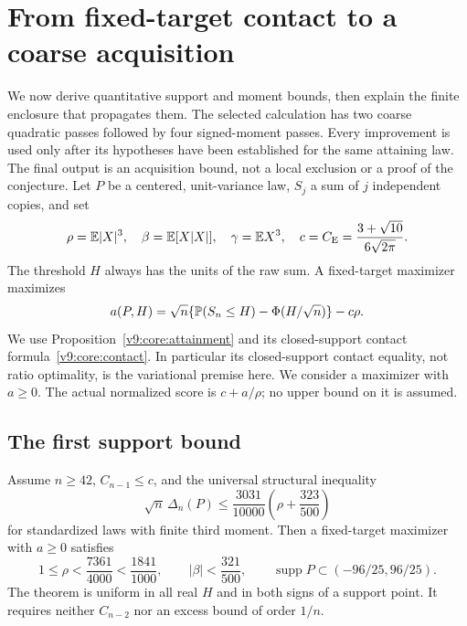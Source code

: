 \section{From fixed-target contact to a coarse acquisition}
\label{v9:entry:section}

We now derive quantitative support and moment bounds, then explain the
finite enclosure that propagates them. The selected calculation has two
coarse quadratic passes followed by four signed-moment passes. Every
improvement is used only after its hypotheses have been established for
the same attaining law. The final output is an acquisition bound, not a
local exclusion or a proof of the conjecture.
Let $P$ be a centered,
unit-variance law, $S_j$ a sum of $j$ independent copies, and set
\[
 \rho=\mathbb E|X|^3,\quad \beta=\mathbb E[X|X|],\quad \gamma=\mathbb E X^3,
 \quad c=C_{\mathrm E}=\frac{3+\sqrt{10}}{6\sqrt{2\pi}}.
\]
The threshold $H$ always has the units of the raw sum. A fixed-target
maximizer maximizes
\[
 a(P,H)=\sqrt n\{\mathbb P(S_n\le H)-\Phi(H/\sqrt n)\}-c\rho.
\]
We use Proposition~\ref{v9:core:attainment} and its closed-support
contact formula~\eqref{v9:core:contact}. In particular its closed-support contact
equality, not ratio optimality, is the variational premise here. We consider
a maximizer with $a\ge0$. The actual normalized score is $c+a/\rho$;
no upper bound on it is assumed.

\subsection{The first support bound}
\begin{theorem}\label{v9:entry:initial}\label{v9:entry:initial-support}
Assume $n\ge42$, $C_{n-1}\le c$, and the universal structural inequality
\begin{equation}\label{v9:entry:structural}
 \sqrt n\,\Delta_n(P)\le\frac{3031}{10000}
                  \left(\rho+\frac{323}{500}\right)
\end{equation}
for standardized laws with finite third moment. Then a fixed-target
maximizer with $a\ge0$ satisfies
\begin{equation}\label{v9:entry:entry}
 1\le\rho<\frac{7361}{4000}<\frac{1841}{1000},\qquad
 |\beta|<\frac{321}{500},\qquad
 \operatorname{supp}P\subset(-96/25,96/25).
\end{equation}
The theorem is uniform in all real $H$ and in both signs of a support
point. It requires neither $C_{n-2}$ nor an excess bound of order $1/n$.
\end{theorem}

